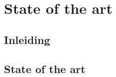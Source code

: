 





 
\chapter{State of the art}


\section{Inleiding}
 

\section{State of the art}
 
 
   
   
   
   
   
   
   
   
   
   
   
    
   
   
   
   
   
   
   
   
   
   

